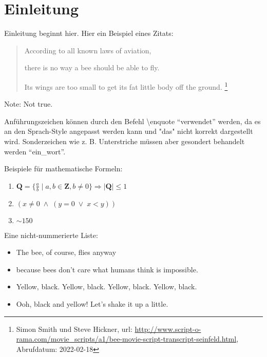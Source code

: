 \chapter{Einleitung}

Einleitung beginnt hier. 
Hier ein Beispiel eines Zitats:
\begin{quote}
According to all known laws
of aviation,

there is no way a bee
should be able to fly.

Its wings are too small to get
its fat little body off the ground.
\footnote{
Simon Smith und Steve Hickner, 
url: \url{http://www.script-o-rama.com/movie_scripts/a1/bee-movie-script-transcript-seinfeld.html}, 
Abrufdatum: 2022-02-18\cite{bee_movie}
}
\end{quote}
\vspace{-0.5cm} %
\begin{flushright}
{\footnotesize Note: Not true.} 
\end{flushright}

Anführungszeichen können durch den Befehl \textbackslash{}enquote \enquote{verwendet} werden, da es an den Sprach-Style angepasst werden kann und "das" nicht korrekt dargestellt wird.
Sonderzeichen wie z. B. Unterstriche müssen aber gesondert behandelt werden \enquote{ein\_wort}.

Beispiele für mathematische Formeln:
\begin{enumerate}
    \item $\mathbf{Q} = \{{\frac{a}{b}} \mid a,b \in \mathbf{Z} , b \neq 0\}
        \Rightarrow |\mathbf{Q}| \leq 1$
    \item $(x \neq 0 \; \land \; (y = 0 \; \lor \; x < y))$
    \item $\sim150$
\end{enumerate}

\clearpage %

Eine nicht-nummerierte Liste:
\begin{itemize}
    \setlength{\itemsep}{5pt}
    \setlength{\parskip}{0pt}
    \setlength{\parsep}{0pt}
    \item The bee, of course, flies anyway
    \item because bees don't care what humans think is impossible.
    \item Yellow, black. Yellow, black. Yellow, black. Yellow, black.
    \item Ooh, black and yellow! Let's shake it up a little.
\end{itemize}

